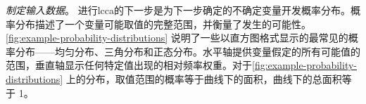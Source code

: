 \emph{制定输入数据}。 进行\acrlong*{lcca}的下一步是为下一步确定的不确定变量开发概率分布。概率分布描述了一个变量可能取值的完整范围，并衡量了发生的可能性。\cref{fig:example-probability-distributions} 说明了一些以直方图格式显示的最常见的概率分布——均匀分布、三角分布和正态分布。水平轴提供变量假定的所有可能值的范围，垂直轴显示任何特定值出现的相对频率权重。对于\cref{fig:example-probability-distributions} 上的分布，取值范围的概率等于曲线下的面积，曲线下的总面积等于 1。

